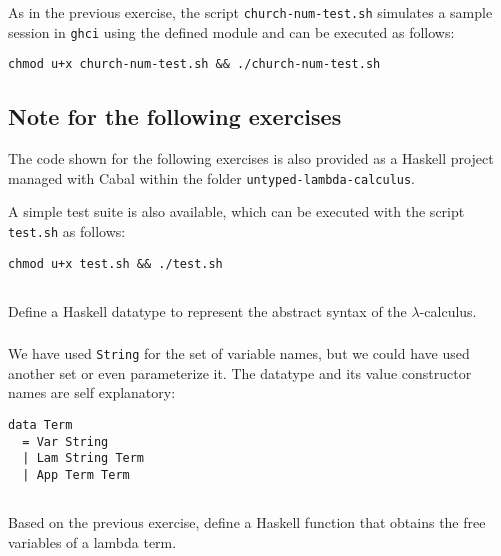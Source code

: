\documentclass{article}
\begin{document}
As in the previous exercise, the script \verb|church-num-test.sh| 
simulates a sample session in \verb|ghci| using the defined module 
and can be executed as follows:

\begin{verbatim}
chmod u+x church-num-test.sh && ./church-num-test.sh
\end{verbatim}

\subsection*{Note for the following exercises}

The code shown for the following exercises is also provided 
as a Haskell project managed with Cabal within the folder 
\verb|untyped-lambda-calculus|.

A simple test suite is also available, which can be executed 
with the script \verb|test.sh| as follows:

\begin{verbatim}
chmod u+x test.sh && ./test.sh
\end{verbatim}

\subsection{}\label{ex:13}

Define a Haskell datatype to represent the abstract 
syntax of the $\lambda$-calculus.

\subsubsection{}

We have used \verb|String| for the set of variable names, but we 
could have used another set or even parameterize it. The datatype 
and its value constructor names are self explanatory:

\begin{verbatim}
data Term
  = Var String
  | Lam String Term
  | App Term Term
\end{verbatim}

\subsection{}\label{ex:14}

Based on the previous exercise, define a Haskell function 
that obtains the free variables of a lambda term.

\subsubsection{}
\end{document}
